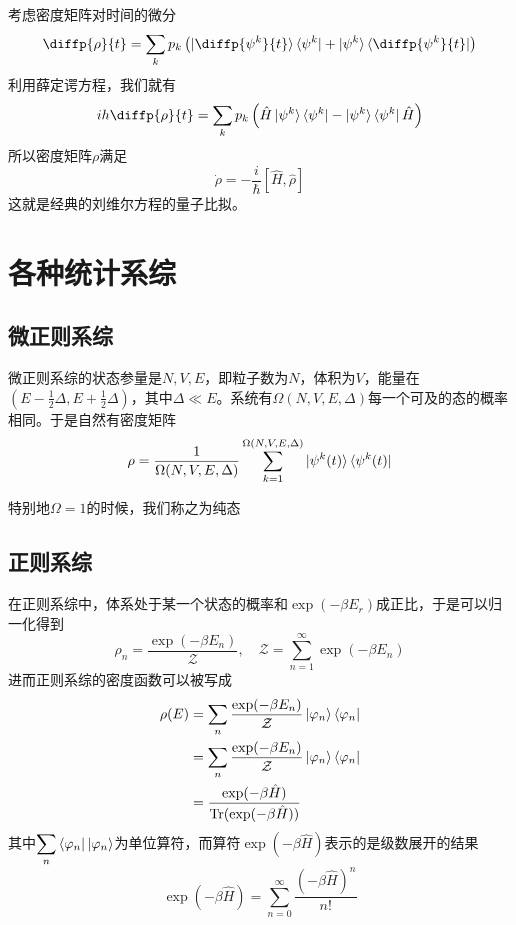 考虑密度矩阵对时间的微分\begin{equation}
    \diffp{\rho}{t}= \sum_{k}p_k \left(\ket{{\diffp{{\psi^k}}{t}}}\bra{{\psi^k}}+\ket{{\psi^k}}\bra{\diffp{{\psi^k}}{t}}\right)
\end{equation}
利用薛定谔方程，我们就有\begin{equation}
    ih\diffp{\rho}{t}= \sum_{k}p_k \left(\hat{H}\ket{{\psi^k}}\bra{{\psi^k}}-\ket{{\psi^k}}\bra{{\psi^k}}\hat{H}\right)
\end{equation}
所以密度矩阵$\rho$满足\begin{equation}
    \dot{\rho} =-\frac{i}{\hbar} \left[\hat{H},\hat{\rho}\right]
\end{equation}
这就是经典的刘维尔方程的量子比拟。 
\section{各种统计系综} %
\label{sec:各种统计系综}
\subsection{微正则系综} %
\label{sub:quantum 微正则系综}
微正则系综的状态参量是$N,V,E$，即粒子数为$N$，体积为$V$，能量在$\displaystyle \left(E-\frac12\Delta, E+\frac12\Delta\right)$，其中$\Delta \ll E$。系统有$\Omega(N,V,E,\Delta)$每一个可及的态的概率相同。于是自然有密度矩阵\begin{equation}
    \rho = \frac{1}{\Omega(N,V,E,\Delta)} \sum_{k=1}^{\Omega(N,V,E,\Delta)} \ket{\psi^k(t)}\bra{\psi^k(t)}
\end{equation}

特别地$\Omega=1$的时候，我们称之为纯态
\subsection{正则系综} %
\label{sub:quantum 正则系综}
在正则系综中，体系处于某一个状态的概率和$\exp(-\beta E_r)$成正比，于是可以归一化得到\begin{equation}
    \rho_n = \frac{\exp(-\beta E_n)}{\mathcal{Z}},\quad \mathcal{Z}=\sum_{n=1}^{\infty} \exp(-\beta E_n)
\end{equation}
进而正则系综的密度函数可以被写成\begin{equation}
    \begin{aligned}
        \rho(E) &= \sum_{n} \frac{\exp(-\beta E_n)}{\mathcal{Z}}   \ket{\varphi_n}\bra{\varphi_n}\\
        &= \sum_{n}\frac{\exp(-\beta E_n)}{\mathcal{Z}}   \ket{\varphi_n}\bra{\varphi_n}\\
        & =\frac{\exp(-\beta \hat{H})}{\operatorname{Tr}( \exp(-\beta \hat{H}))}
    \end{aligned}
\end{equation}
其中$\displaystyle \sum_n \bra{\varphi_n}\ket{\varphi_n}$为单位算符，而算符$\exp(-\beta \hat{H})$表示的是级数展开的结果\begin{equation}
    \exp(-\beta \hat{H})=\sum_{n=0}^{\infty} \frac{(-\beta \hat{H})^n}{n!}
\end{equation}

